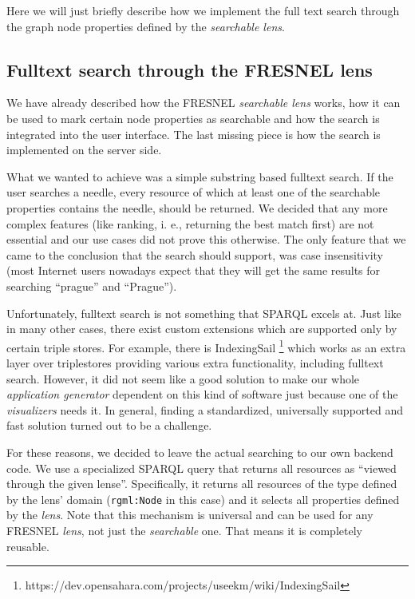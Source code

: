 Here we will just briefly describe how we implement the full text search through the graph node properties defined by the \emph{searchable lens}.

\subsection{Fulltext search through the FRESNEL lens}
\label{sec:visualizers:chord:search}

We have already described how the FRESNEL \emph{searchable lens} works, how it can be used to mark certain node properties as searchable and how the search is integrated into the user interface. The last missing piece is how the search is implemented on the server side.

What we wanted to achieve was a simple substring based fulltext search. If the user searches a needle, every resource of which at least one of the searchable properties contains the needle, should be returned. We decided that any more complex features (like ranking, i. e., returning the best match first) are not essential and our use cases did not prove this otherwise. The only feature that we came to the conclusion that the search should support, was case insensitivity (most Internet users nowadays expect that they will get the same results for searching “prague” and “Prague”).

Unfortunately, fulltext search is not something that SPARQL excels at. Just like in many other cases, there exist custom extensions which are supported only by certain triple stores. For example, there is IndexingSail \footnote{https://dev.opensahara.com/projects/useekm/wiki/IndexingSail} which works as an extra layer over triplestores providing various extra functionality, including fulltext search. However, it did not seem like a good solution to make our whole \emph{application generator} dependent on this kind of software just because one of the \emph{visualizers} needs it.  In general, finding a standardized, universally supported and fast solution turned out to be a challenge.

For these reasons, we decided to leave the actual searching to our own backend code. We use a specialized SPARQL query that returns all resources as “viewed through the given lense”. Specifically, it returns all resources of the type defined by the lens’ domain (\texttt{rgml:Node} in this case) and it selects all properties defined by the \emph{lens}. Note that this mechanism is universal and can be used for any FRESNEL \emph{lens}, not just the \emph{searchable} one. That means it is completely reusable.

